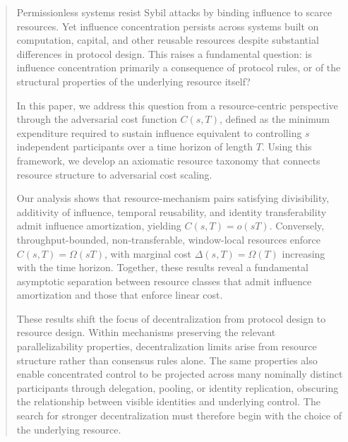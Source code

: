 \documentclass[manuscript,review]{acmart}
\theoremstyle{remark}
\begin{document}
	\begin{abstract}
		Permissionless systems resist Sybil attacks by binding influence
		to scarce resources. Yet influence concentration persists across
		systems built on computation, capital, and other reusable resources
		despite substantial differences in protocol design. This raises a
		fundamental question: is influence concentration primarily a
		consequence of protocol rules, or of the structural properties of
		the underlying resource itself?
		
		In this paper, we address this question from a resource-centric
		perspective through the adversarial cost function $C(s,T)$,
		defined as the minimum expenditure required to sustain
		influence equivalent to controlling $s$ independent
		participants over a time horizon of length $T$. Using this framework, we develop an axiomatic resource
		taxonomy that connects resource structure to adversarial cost
		scaling.
		
		Our analysis shows that resource-mechanism pairs satisfying
		divisibility, additivity of influence, temporal reusability, and
		identity transferability admit influence amortization, yielding
		$C(s,T)=o(sT)$. Conversely, throughput-bounded,
		non-transferable, window-local resources enforce
		$C(s,T)=\Omega(sT)$, with marginal cost
		$\Delta(s,T)=\Omega(T)$ increasing with the time horizon.
		Together, these results reveal a fundamental asymptotic
		separation between resource classes that admit influence
		amortization and those that enforce linear cost.
		
		These results shift the focus of decentralization from protocol
		design to resource design. Within mechanisms preserving the
		relevant parallelizability properties, decentralization limits
		arise from resource structure rather than consensus rules alone. The same properties also enable concentrated
		control to be projected across many nominally distinct
		participants through delegation, pooling, or identity
		replication, obscuring the relationship between visible
		identities and underlying control. The search for stronger
		decentralization must therefore begin with the choice of the
		underlying resource.
		
	\end{abstract}
	
	
	
	
\end{document}
